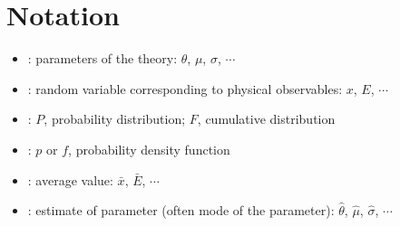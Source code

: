 \section{Notation} 

\begin{itemize}[$\to$]
	\item {}: parameters of the theory: $\theta$, $\mu$, $\sigma$, $\cdots$
	\item {}: random variable corresponding to physical observables: $x$, $E$, $\cdots$
	\item {}: $P$, probability distribution; $F$, cumulative distribution
	\item {}: $p$ or $f$, probability density function
	\item {}: average value: $\bar{x}$, $\bar{E}$, $\cdots$
	\item {}: estimate of parameter (often mode of the parameter): $\hat{\theta}$, $\hat{\mu}$, $\hat{\sigma}$, $\cdots$
\end{itemize}
